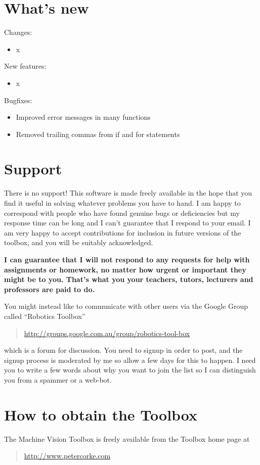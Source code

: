 \documentclass[a4paper]{report}
\begin{document}
\section{What's new}

Changes:
\begin{itemize}
\item x

\end{itemize}

New features:
\begin{itemize}
\item x
\end{itemize}

Bugfixes:
\begin{itemize}
\item Improved error messages in many functions
\item Removed trailing commas from if and for statements
\end{itemize}


\section{Support}
There is no support!  This software is made freely available in the hope that you find it useful in solving whatever problems
you have to hand.
I am happy to correspond with people who have found genuine
bugs or deficiencies but my response time can be long and I can't guarantee that I respond to your email.
I am very happy to accept contributions for inclusion in future versions of the
toolbox, and you will be suitably acknowledged.

\textbf{I can guarantee that I will not respond to any requests for help with assignments or homework, no matter
how urgent or important they might be to you.  That's what you your teachers, tutors, lecturers and professors are paid to do.}

You might instead like to communicate with other users via 
the Google Group called ``Robotics Toolbox'' 
\begin{quote}
\url{http://groups.google.com.au/group/robotics-tool-box}
\end{quote}
which is a forum for discussion.
You need to signup in order to post, and the signup process is moderated by me so allow a few
days for this to happen.  I need you to write a few words about why you want to join the list
so I can distinguish you from a spammer or a web-bot.

\section{How to obtain the Toolbox}
The Machine Vision Toolbox is freely available from the Toolbox home
page at 
\begin{quote}
\url{http://www.petercorke.com}
\end{quote}
\end{document}
